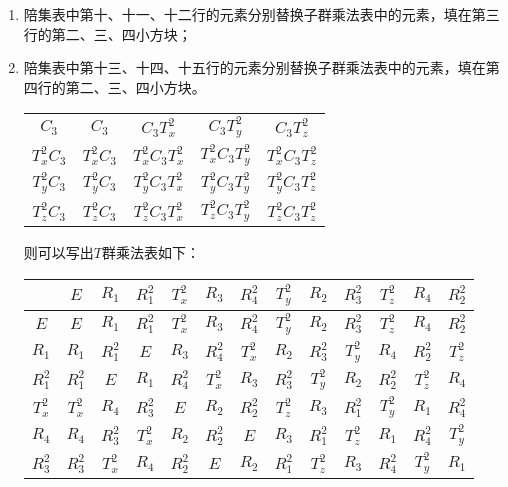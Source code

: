 \documentclass[reqno,a4paper,12pt]{amsart}
\begin{document}
\begin{enumerate}[1.]
\begin{tcolorbox}[breakable, colback = black!5!white, colframe = black]
\begin{enumerate}[(1)]
\item 陪集表中第十、十一、十二行的元素分别替换子群乘法表中的元素，填在第三行的第二、三、四小方块；

\item 陪集表中第十三、十四、十五行的元素分别替换子群乘法表中的元素，填在第四行的第二、三、四小方块。

\begin{table}[H]
\centering
\begin{tabular}{|c|c|c|c|c|}
	\hline
	\makebox[0.15\textwidth][c]{} & \makebox[0.15\textwidth][c]{$C_3$} & \makebox[0.15\textwidth][c]{$C_3T_x^2$} & \makebox[0.15\textwidth][c]{$C_3T_y^2$} & \makebox[0.15\textwidth][c]{$C_3T_z^2$} \\
	\hline 
	$C_3$ & $C_3$ & $C_3T_x^2$ & $C_3T_y^2$ & $C_3T_z^2$ \\
	\hline 
	$T_x^2C_3$ & $T_x^2C_3$ & $T_x^2C_3T_x^2$ & $T_x^2C_3T_y^2$ & $T_x^2C_3T_z^2$ \\
	\hline 
	$T_y^2C_3$ & $T_y^2C_3$ & $T_y^2C_3T_x^2$ & $T_y^2C_3T_y^2$ & $T_y^2C_3T_z^2$ \\
	\hline 
	$T_z^2C_3$ & $T_z^2C_3$ & $T_z^2C_3T_x^2$ & $T_z^2C_3T_y^2$ & $T_z^2C_3T_z^2$ \\
	\hline
\end{tabular}
\end{table}
则可以写出$T$群乘法表如下：
\begin{table}[H]
\centering
\begin{tabular}{|c|ccc|ccc|ccc|ccc|}
	\hline
	 & $E$ & $R_1$ & $R_1^2$ & $T_x^2$ & $R_3$ & $R_4^2$ & $T_y^2$ & $R_2$ & $R_3^2$ & $T_z^2$ & $R_4$ & $R_2^2$ \\
	\hline
	$E$ & $E$ & $R_1$ & $R_1^2$ & $T_x^2$ & $R_3$ & $R_4^2$ & $T_y^2$ & $R_2$ & $R_3^2$ & $T_z^2$ & $R_4$ & $R_2^2$ \\
	$R_1$ & $R_1$ & $R_1^2$ & $E$ & $R_3$ & $R_4^2$ & $T_x^2$ & $R_2$ & $R_3^2$ & $T_y^2$ & $R_4$ & $R_2^2$ & $T_z^2$ \\
	$R_1^2$ & $R_1^2$ & $E$ & $R_1$ & $R_4^2$ & $T_x^2$ & $R_3$ & $R_3^2$ & $T_y^2$ & $R_2$ & $R_2^2$ & $T_z^2$ & $R_4$ \\
	\hline
	$T_x^2$ & $T_x^2$ & $R_4$ & $R_3^2$ & $E$ & $R_2$ & $R_2^2$ & $T_z^2$ & $R_3$ & $R_1^2$ & $T_y^2$ & $R_1$ & $R_4^2$ \\
	$R_4$ & $R_4$ & $R_3^2$ & $T_x^2$ & $R_2$ & $R_2^2$ & $E$ & $R_3$ & $R_1^2$ & $T_z^2$ & $R_1$ & $R_4^2$ & $T_y^2$ \\
	$R_3^2$ & $R_3^2$ & $T_x^2$ & $R_4$ & $R_2^2$ & $E$ & $R_2$ & $R_1^2$ & $T_z^2$ & $R_3$ & $R_4^2$ & $T_y^2$ & $R_1$ \\

\end{tabular}
\end{table}
\end{enumerate}
\end{tcolorbox}
\end{enumerate}
\end{document}
